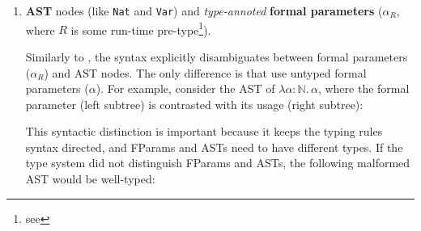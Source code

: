 \begin{enumerate}
\item \textbf{AST} nodes (like \texttt{Nat} and \texttt{Var}) and \textit{type-annoted} \textbf{formal parameters} ($\alpha_R$, where $R$ is some run-time pre-type\footnote{see }).

Similarly to \citet{calcagno-2003}, the syntax explicitly disambiguates between formal parameters ($\alpha_R$) and AST nodes. The only difference is that \citeauthor{calcagno-2003} use untyped formal parameters ($\alpha$). For example, consider the AST of $\lambda\alpha{}$${:}\mathbb{N}. \,\alpha$, where the formal parameter (left subtree) is contrasted with its usage (right subtree):

\begin{center}
\end{center}

This syntactic distinction is important because it keeps the typing rules syntax directed, and \textsf{FParam}s and \textsf{AST}s need to have different types. If the type system did not distinguish \textsf{FParam}s and \textsf{AST}s, the following malformed AST would be well-typed:
\begin{center}
\end{center}



\end{enumerate}
